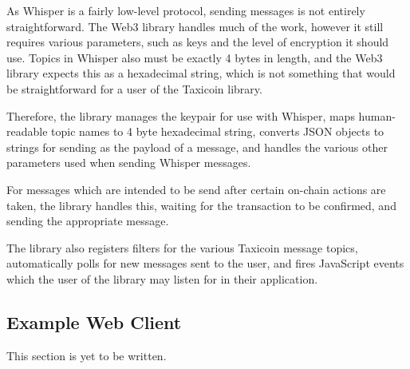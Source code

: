 As Whisper is a fairly low-level protocol, sending messages is not entirely straightforward. The Web3 library handles much of the work, however it still requires various parameters, such as keys and the level of encryption it should use. Topics in Whisper also must be exactly 4 bytes in length, and the Web3 library expects this as a hexadecimal string, which is not something that would be straightforward for a user of the Taxicoin library.

Therefore, the library manages the keypair for use with Whisper, maps human-readable topic names to 4 byte hexadecimal string, converts JSON objects to strings for sending as the payload of a message, and handles the various other parameters used when sending Whisper messages.

For messages which are intended to be send after certain on-chain actions are taken, the library handles this, waiting for the transaction to be confirmed, and sending the appropriate message.

The library also registers filters for the various Taxicoin message topics, automatically polls for new messages sent to the user, and fires JavaScript events which the user of the library may listen for in their application.

\subsection{Example Web Client}

This section is yet to be written.

